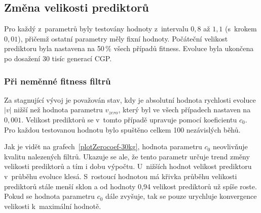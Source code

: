 \subsection{Změna velikosti prediktorů}

Pro každý z~parametrů byly testovány hodnoty z~intervalu $0,8$ až $1,1$ (s~krokem $0,01$), přičemž ostatní parametry měly fixní hodnoty. Počáteční velikost prediktoru byla nastavena na 50\,\% všech případů fitness. Evoluce byla ukončena po dosažení 30 tisíc generací CGP.

\subsubsection*{Při neměnné fitness filtrů}

Za stagnující vývoj je považován stav, kdy je absolutní hodnota rychlosti evoluce $|v|$ nižší než hodnota parametru $v_\mathit{zero}$, který byl ve všech případech nastaven na $0,001$. Velikost prediktorů se v~tomto případě upravuje pomocí koeficientu $c_0$. Pro každou testovanou hodnotu bylo spuštěno celkem 100 nezávislých běhů.

Jak je vidět na grafech~\ref{plotZerocoef-30kg}, hodnota parametru $c_0$ neovlivňuje kvalitu nalezených filtrů. Ukazuje se ale, že tento parametr určuje trend změny velikosti prediktorů a tím i dobu výpočtu. U~nižších hodnot velikost prediktoru v~průběhu evoluce klesá. S~rostoucí hodnotou má křivka průběhu velikosti prediktorů stále menší sklon a od hodnoty 0,94 velikost prediktorů už spíše roste. Pokud se hodnota parametru $c_0$ dále zvyšuje, tak se pouze urychluje konvergence velikosti k~maximální hodnotě.

